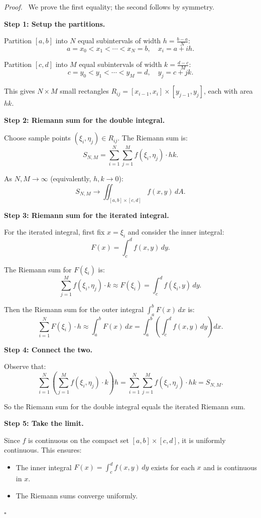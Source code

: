 \documentclass[11pt]{report}
\renewenvironment{proof}[1][Proof]{\par\noindent\textit{#1.}\ }{\hfill$\square$\par\medskip}
\begin{document}
\begin{proof}
We prove the first equality; the second follows by symmetry.

\textbf{Step 1: Setup the partitions.}

Partition $[a, b]$ into $N$ equal subintervals of width $h = \frac{b-a}{N}$:
\[
a = x_0 < x_1 < \cdots < x_N = b, \quad x_i = a + ih.
\]

Partition $[c, d]$ into $M$ equal subintervals of width $k = \frac{d-c}{M}$:
\[
c = y_0 < y_1 < \cdots < y_M = d, \quad y_j = c + jk.
\]

This gives $N \times M$ small rectangles $R_{ij} = [x_{i-1}, x_i] \times [y_{j-1}, y_j]$, each with area $hk$.

\textbf{Step 2: Riemann sum for the double integral.}

Choose sample points $(\xi_i, \eta_j) \in R_{ij}$. The Riemann sum is:
\[
S_{N,M} = \sum_{i=1}^{N} \sum_{j=1}^{M} f(\xi_i, \eta_j) \cdot hk.
\]

As $N, M \to \infty$ (equivalently, $h, k \to 0$):
\[
S_{N,M} \to \iint_{[a,b] \times [c,d]} f(x, y) \, dA.
\]

\textbf{Step 3: Riemann sum for the iterated integral.}

For the iterated integral, first fix $x = \xi_i$ and consider the inner integral:
\[
F(x) = \int_c^d f(x, y) \, dy.
\]

The Riemann sum for $F(\xi_i)$ is:
\[
\sum_{j=1}^{M} f(\xi_i, \eta_j) \cdot k \approx F(\xi_i) = \int_c^d f(\xi_i, y) \, dy.
\]

Then the Riemann sum for the outer integral $\int_a^b F(x) \, dx$ is:
\[
\sum_{i=1}^{N} F(\xi_i) \cdot h \approx \int_a^b F(x) \, dx = \int_a^b \left( \int_c^d f(x, y) \, dy \right) dx.
\]

\textbf{Step 4: Connect the two.}

Observe that:
\[
\sum_{i=1}^{N} \left( \sum_{j=1}^{M} f(\xi_i, \eta_j) \cdot k \right) h = \sum_{i=1}^{N} \sum_{j=1}^{M} f(\xi_i, \eta_j) \cdot hk = S_{N,M}.
\]

So the Riemann sum for the double integral equals the iterated Riemann sum.

\textbf{Step 5: Take the limit.}

Since $f$ is continuous on the compact set $[a,b] \times [c,d]$, it is uniformly continuous. This ensures:
\begin{itemize}
    \item The inner integral $F(x) = \int_c^d f(x, y) \, dy$ exists for each $x$ and is continuous in $x$.
    \item The Riemann sums converge uniformly.
\end{itemize}


\end{proof}
\end{document}
